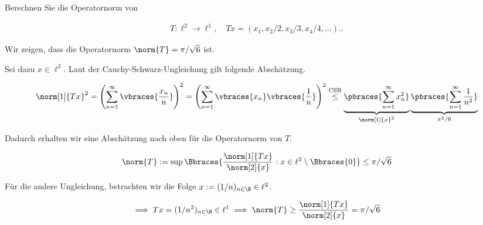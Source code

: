 
\begin{exercise}

Berechnen Sie die Operatornorm von

\begin{align*}
    T: \ell^2 \to \ell^1,
    \quad
    Tx = (x_1, x_2 / 2, x_3 / 3, x_4 / 4, \ldots)..
\end{align*}

\end{exercise}


\begin{solution}

Wir zeigen, dass die Operatornorm $\norm{T} = \pi / \sqrt{6}$ ist.

Sei dazu $x \in \ell^2$.
Laut der Cauchy-Schwarz-Ungleichung gilt folgende Abschätzung.

\begin{align*}
    \norm[1]{Tx}^2
    =
    \left(\sum_{n=1}^\infty
    \vbraces
    {
        \frac{x_n}{n}
    }\right)^2
    =
    \left(\sum_{n=1}^\infty
    \vbraces{x_n}
    \vbraces
    {
        \frac{1}{n}
    }\right)^2
    \stackrel{\text{CSB}}{\leq}
    \underbrace
    {
        \pbraces
        {
            \sum_{n=1}^\infty
            x_n^2
        }
    }_{
        \norm[1]{x}^2
    }
    \underbrace
    {
        \pbraces
        {
            \sum_{n=1}^\infty
            \frac{1}{n^2}
        }
    }_{
        \pi^2 / 6
    }
\end{align*}

Dadurch erhalten wir eine Abschätzung nach oben für die Operatornorm von $T$.

\begin{align*}
    \norm{T}
    :=
    \sup
    \Bbraces
    {
        \frac
        {
            \norm[1]{Tx}
        }{
            \norm[2]{x}
        }:
        x \in \ell^2 \setminus \Bbraces{0}
    }
    \leq
    \pi / \sqrt{6}
\end{align*}

Für die andere Ungleichung, betrachten wir die Folge $x := (1/n)_{n \in \N} \in \ell^2$.

\begin{align*}
    \implies
    Tx = (1/n^2)_{n \in \N} \in \ell^1
    \implies
    \norm{T}
    \geq
    \frac
        {
            \norm[1]{Tx}
        }{
            \norm[2]{x}
        }
    =
    \pi / \sqrt{6}
\end{align*}

\end{solution}

